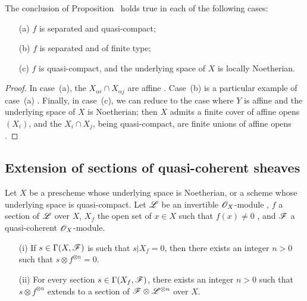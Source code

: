 \begin{corollary}[9.2.2]
\label{I.9.2.2}
The conclusion of Proposition~ holds true in each of the following cases:
\begin{enumerate}
  \item[{\rm(a)}] $f$ is separated and quasi-compact;
  \item[{\rm(b)}] $f$ is separated and of finite type;
  \item[{\rm(c)}] $f$ is quasi-compact, and the underlying space of $X$ is locally Noetherian.
\end{enumerate}
\end{corollary}

\begin{proof}
In case~(a), the $X_{\alpha i}\cap X_{\alpha j}$ are affine .
Case~(b) is a particular example of case~(a) . Finally, in case~(c), we can reduce to the case where $Y$ is affine and the underlying space of $X$ is Noetherian; then $X$ admits a finite cover of affine opens $(X_i)$, and the $X_i\cap X_j$, being quasi-compact, are finite unions of affine opens .
\end{proof}

\subsection{Extension of sections of quasi-coherent sheaves}
\label{subsection:I.9.3}

\begin{theorem}[9.3.1]
\label{I.9.3.1}
Let $X$ be a prescheme whose underlying space is Noetherian, or a scheme whose underlying
space is quasi-compact. Let $\mathscr{L}$ be an invertible $\mathscr{O}_X$-module , $f$ a
section of $\mathscr{L}$ over $X$, $X_f$ the open set of $x\in X$ such that $f(x)\neq0$
, and $\mathscr{F}$ a quasi-coherent $\mathscr{O}_X$-module.
\begin{enumerate}
  \item[{\rm(i)}] If $s\in\Gamma(X,\mathscr{F})$ is such that $s|X_f=0$, then there exists an integer $n>0$ such that $s\otimes f^{\otimes n}=0$.
  \item[{\rm(ii)}] For every section $s\in\Gamma(X_f,\mathscr{F})$, there exists an integer $n>0$ such that $s\otimes f^{\otimes n}$ extends to a section of $\mathscr{F}\otimes\mathscr{L}^{\otimes n}$ over $X$.
\end{enumerate}
\end{theorem}

